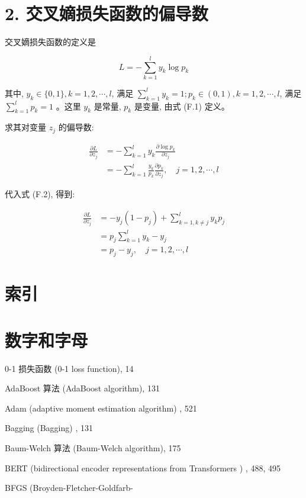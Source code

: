 \documentclass[10pt]{article}
\begin{document}
\section*{2. 交叉嫡损失函数的偏导数}
交叉嫡损失函数的定义是


\begin{equation*}
L=-\sum_{k=1}^{l} y_{k} \log p_{k} \tag{F.3}
\end{equation*}


其中, $y_{k} \in\{0,1\}, k=1,2, \cdots, l$, 满足 $\sum_{k=1}^{l} y_{k}=1 ; p_{k} \in(0,1), k=1,2, \cdots, l$, 满足 $\sum_{k=1}^{l} p_{k}=1$ 。这里 $y_{k}$ 是常量, $p_{k}$ 是变量, 由式 (F.1) 定义。

求其对变量 $z_{j}$ 的偏导数:

$$
\begin{aligned}
\frac{\partial L}{\partial z_{j}} & =-\sum_{k=1}^{l} y_{k} \frac{\partial \log p_{k}}{\partial z_{j}} \\
& =-\sum_{k=1}^{l} \frac{y_{k}}{p_{k}} \frac{\partial p_{k}}{\partial z_{j}}, \quad j=1,2, \cdots, l
\end{aligned}
$$

代入式 (F.2), 得到:


\begin{align*}
\frac{\partial L}{\partial z_{j}} & =-y_{j}\left(1-p_{j}\right)+\sum_{k=1, k \neq j}^{l} y_{k} p_{j} \\
& =p_{j} \sum_{k=1}^{l} y_{k}-y_{j} \\
& =p_{j}-y_{j}, \quad j=1,2, \cdots, l \tag{F.4}
\end{align*}


\section*{索引}
\section*{数字和字母}
0-1 损失函数 (0-1 loss function), 14

AdaBoost 算法 (AdaBoost algorithm), 131

Adam (adaptive moment estimation algorithm) , 521

Bagging (Bagging) , 131

Baum-Welch 算法 (Baum-Welch algorithm), 175

BERT (bidirectional encoder representations from Transformers ) , 488, 495

BFGS (Broyden-Fletcher-Goldfarb-
\end{document}
